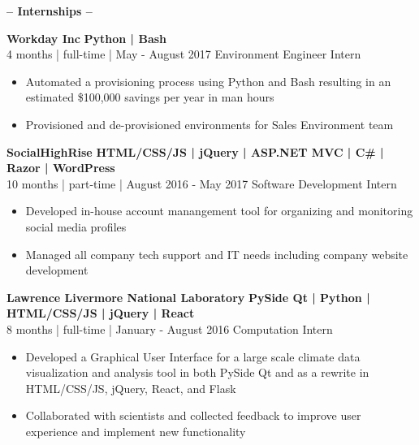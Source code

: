 \documentclass[12pt]{article}
\begin{document}
    \begin{center}
    \textbf{\Large-- Internships --}\\
    \end{center}
    \vspace{-5mm}

    \begin{footnotesize}
    \flushleft
    \textbf{\color{primary}\large Workday Inc} \hfill \textbf{\color{Cerulean}Python | Bash}\\ 
    {\color{primary}4 months | full-time | May - August 2017} \hfill {\color{Cerulean} Environment Engineer Intern}
    \vspace{-1mm}
    \begin{itemize}
        \setlength{\itemsep}{0pt}
        \item Automated a provisioning process using Python and Bash resulting in an estimated \$100,000 savings per year in man hours
        \item Provisioned and de-provisioned environments for Sales Environment team
    \end{itemize}
    \textbf{\color{primary}\large SocialHighRise} \hfill  \textbf{\color{Cerulean}HTML/CSS/JS | jQuery | ASP.NET MVC | C\# | Razor | WordPress } \\ 
    {\color{primary}10 months | part-time | August 2016 - May 2017} \hfill {\color{Cerulean} Software Development Intern}
    \vspace{-2mm}
    \begin{itemize}
        \setlength{\itemsep}{0pt}
        \item Developed in-house account manangement tool for organizing and monitoring social media profiles
        \item Managed all company tech support and IT needs including company website development
    \end{itemize}
    \textbf{\color{primary}\large Lawrence Livermore National Laboratory} \hfill \textbf{\color{Cerulean}PySide Qt | Python | HTML/CSS/JS | jQuery | React}\\
    {\color{primary}8 months | full-time | January - August 2016} \hfill {\color{Cerulean} Computation Intern}
    \vspace{-1mm}
    \begin{itemize}
        \setlength{\itemsep}{0pt}
        \item Developed a Graphical User Interface for a large scale climate data visualization and analysis tool in both PySide Qt and as a rewrite in HTML/CSS/JS, jQuery, React, and Flask

        \item Collaborated with scientists and collected feedback to improve user experience and implement new functionality
    \end{itemize}

    \end{footnotesize}
    
\end{document}
